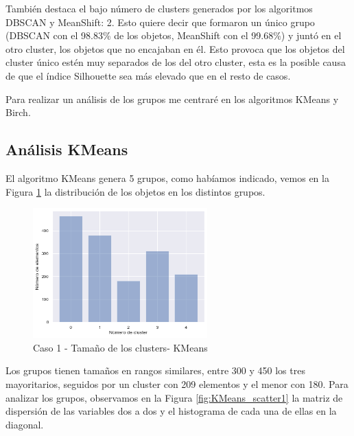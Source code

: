 \documentclass[a4paper, 20pt]{article}
\begin{document}
También destaca el bajo número de clusters generados por los algoritmos DBSCAN y MeanShift: 2. Esto quiere decir que formaron un único grupo (DBSCAN con el 98.83\% de los objetos, MeanShift con el 99.68\%) y juntó en el otro cluster, los objetos que no encajaban en él. Esto provoca que los objetos del cluster único estén muy separados de los del otro cluster, esta es la posible causa de que el índice Silhouette sea más elevado que en el resto de casos.

Para realizar un análisis de los grupos me centraré en los algoritmos KMeans y Birch.

\subsection{Análisis KMeans}

El algoritmo KMeans genera 5 grupos, como habíamos indicado, vemos en la Figura \ref{fig:KMeans_tam1} la distribución de los objetos en los distintos grupos.

\begin{figure}[H]
    \centering
    \includegraphics[width=0.6\textwidth]{./caso1/KMeans_tam_clusters}
    \caption{Caso 1 - Tamaño de los clusters- KMeans}
    \label{fig:KMeans_tam1}
\end{figure}

Los grupos tienen tamaños en rangos similares, entre 300 y 450 los tres mayoritarios, seguidos por un cluster con 209 elementos y el menor con 180. Para analizar los grupos, observamos en la Figura \ref{fig:KMeans_scatter1} la matriz de dispersión de las variables dos a dos y el histograma de cada una de ellas en la diagonal.
\end{document}
